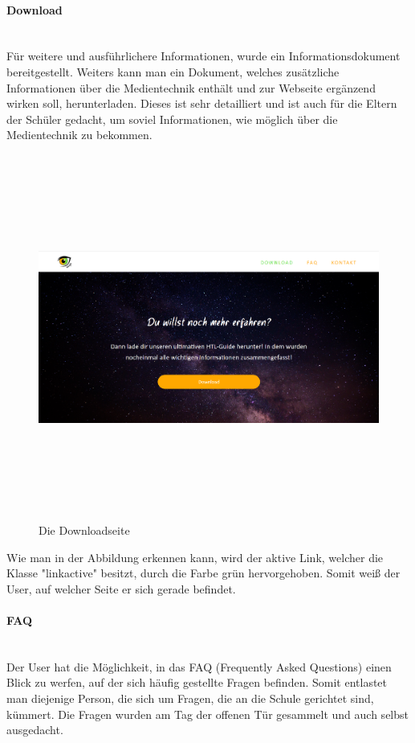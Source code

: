 \paragraph{Download} \leavevmode \\
Für weitere und ausführlichere Informationen, wurde ein Informationsdokument bereitgestellt. Weiters kann man ein Dokument, welches zusätzliche Informationen über die Medientechnik enthält und zur Webseite ergänzend wirken soll, herunterladen. Dieses ist sehr detailliert und ist auch für die Eltern der Schüler gedacht, um soviel Informationen, wie möglich über die Medientechnik zu bekommen.
\begin{figure}[H]
	\centering				\includegraphics[width=12cm,height=12cm,keepaspectratio]{webseite_abb6} 
	\caption{Die Downloadseite}
\end{figure}
Wie man in der Abbildung erkennen kann, wird der aktive Link, welcher die Klasse "linkactive" besitzt, durch die Farbe grün hervorgehoben. Somit weiß der User, auf welcher Seite er sich gerade befindet.

\paragraph{FAQ} \leavevmode \\
Der User hat die Möglichkeit, in das FAQ (Frequently Asked Questions) einen Blick zu werfen, auf der sich häufig gestellte Fragen befinden. Somit entlastet man diejenige Person, die sich um Fragen, die an die Schule gerichtet sind, kümmert. Die Fragen wurden am Tag der offenen Tür gesammelt und auch selbst ausgedacht. 


